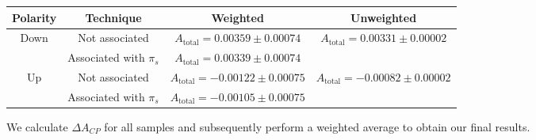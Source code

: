 \documentclass{article}
\begin{document}
        \begin{center}
                \begin{tabular}{c|c|c|c}
                        Polarity & Technique & Weighted & Unweighted\\
                        \hline\hline
                        \multirow{2}{*}{Down} & Not associated & $A_\text{total} = 0.00359 \pm 0.00074$ & \multirow{2}{*}{$A_\text{total} = 0.00331 \pm 0.00002$}\\
                        \cline{2-3}
                        & Associated with $\pi_s$ & $A_\text{total} = 0.00339 \pm 0.00074$ & \\
                        \hline
                        \multirow{2}{*}{Up} & Not associated & $A_\text{total} = - 0.00122 \pm 0.00075$ & \multirow{2}{*}{$A_\text{total} = - 0.00082 \pm 0.00002$}\\
                        \cline{2-3}
                        & Associated with $\pi_s$ & $A_\text{total} = - 0.00105 \pm 0.00075$ & \\
                \end{tabular}
                \label{tab:2018}
        \end{center}

        We calculate $\Delta A_{CP}$ for all samples and subsequently perform a weighted average to obtain our final results.
\end{document}
